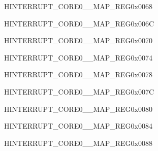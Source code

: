 \begin{register}{H}{INTERRUPT\_CORE0\_\_MAP\_REG}{0x0068}\label{regdesc:INTERRUPTCORE0I2S1INTMAPREG}
\end{register}
\vspace{-3em}

\begin{register}{H}{INTERRUPT\_CORE0\_\_MAP\_REG}{0x006C}\label{regdesc:INTERRUPTCORE0UARTINTRMAPREG}
\end{register}
\vspace{-3em}

\begin{register}{H}{INTERRUPT\_CORE0\_\_MAP\_REG}{0x0070}\label{regdesc:INTERRUPTCORE0UART1INTRMAPREG}
\end{register}
\vspace{-3em}

\begin{register}{H}{INTERRUPT\_CORE0\_\_MAP\_REG}{0x0074}\label{regdesc:INTERRUPTCORE0UART2INTRMAPREG}
\end{register}
\vspace{-3em}

\begin{register}{H}{INTERRUPT\_CORE0\_\_MAP\_REG}{0x0078}\label{regdesc:INTERRUPTCORE0SDIOHOSTINTERRUPTMAPREG}
\end{register}
\vspace{-3em}

\begin{register}{H}{INTERRUPT\_CORE0\_\_MAP\_REG}{0x007C}\label{regdesc:INTERRUPTCORE0PWM0INTRMAPREG}
\end{register}
\vspace{-3em}

\begin{register}{H}{INTERRUPT\_CORE0\_\_MAP\_REG}{0x0080}\label{regdesc:INTERRUPTCORE0PWM1INTRMAPREG}
\end{register}
\vspace{-3em}

\begin{register}{H}{INTERRUPT\_CORE0\_\_MAP\_REG}{0x0084}\label{regdesc:INTERRUPTCORE0PWM2INTRMAPREG}
\end{register}
\vspace{-3em}

\begin{register}{H}{INTERRUPT\_CORE0\_\_MAP\_REG}{0x0088}\label{regdesc:INTERRUPTCORE0PWM3INTRMAPREG}
\end{register}
\vspace{-3em}

